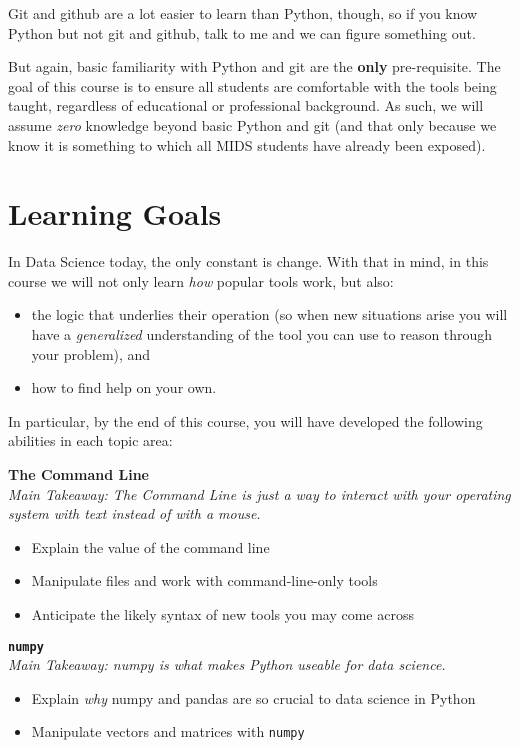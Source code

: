 \documentclass[12pt]{article}
\begin{document}
Git and github are a lot easier to learn than Python, though, so if you know Python but not git and github, talk to me and we can figure something out.

But again, basic familiarity with Python and git are the \textbf{only} pre-requisite. The goal of this course is to ensure all students are comfortable with the tools being taught, regardless of educational or professional background. As such, we will assume \emph{zero} knowledge beyond basic Python and git (and that only because we know it is something to which all MIDS students have already been exposed).

\section{Learning Goals}

In Data Science today, the only constant is change. With that in mind, in this course we will not only learn \emph{how} popular tools work, but also:
\begin{itemize}
	\item the logic that underlies their operation (so when new situations arise you will have a \emph{generalized} understanding of the tool you can use to reason through your problem), and
	\item how to find help on your own.
\end{itemize}

In particular, by the end of this course, you will have developed the following abilities in each topic area:

\textbf{The Command Line}\\
\emph{Main Takeaway: The Command Line is just a way to interact with your operating system with text instead of with a mouse.}
\begin{itemize}
	\item Explain the value of the command line
	\item Manipulate files and work with command-line-only tools
	\item Anticipate the likely syntax of new tools you may come across
\end{itemize}

\textbf{\texttt{numpy}}\\
\emph{Main Takeaway: numpy is what makes Python useable for data science.}
\begin{itemize}
	\item Explain \emph{why} numpy and pandas are so crucial to data science in Python
	\item Manipulate vectors and matrices with \texttt{numpy}
\end{itemize}
\end{document}
